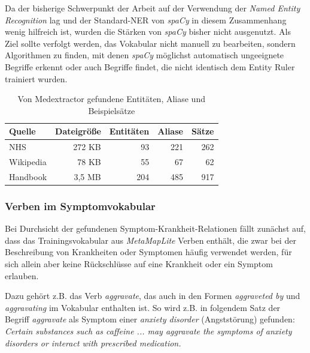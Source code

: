 Da der bisherige Schwerpunkt der Arbeit auf der Verwendung der \emph{Named Entity Recognition} lag und der Standard-NER von \emph{spaCy} in diesem Zusammenhang wenig hilfreich ist, wurden die Stärken von \emph{spaCy} bisher nicht ausgenutzt. Als Ziel sollte verfolgt werden, das Vokabular nicht manuell zu bearbeiten, sondern Algorithmen zu finden, mit denen \emph{spaCy} möglichst automatisch ungeeignete Begriffe erkennt oder auch Begriffe findet, die nicht identisch dem Entity Ruler trainiert wurden.

\begin{table}
\begin{center}
\begin{tabular}{lrrrr}
\hline
\textbf{Quelle}	& \textbf{Dateigröße}	& \textbf{Entitäten} & \textbf{Aliase} & \textbf{Sätze} \\
\hline
NHS &	272 KB & 93 & 221 & 262 \\
Wikipedia & 78 KB & 55 & 67  & 62 \\
Handbook & 3,5 MB & 204 & 485  & 917 \\
\hline
\end{tabular}
\caption{Von Medextractor gefundene Entitäten, Aliase und Beispielsätze}
\label{tab:zaehlung}
\end{center}
\end{table}

\subsubsection{Verben im Symptomvokabular}
\label{subsec: verben} 

Bei Durchsicht der gefundenen Symptom-Krankheit-Relationen fällt zunächst auf, dass das Trainingsvokabular aus \emph{MetaMapLite} Verben enthält, die zwar bei der Beschreibung von Krankheiten oder Symptomen häufig verwendet werden, für sich allein aber keine Rückschlüsse auf eine Krankheit oder ein Symptom erlauben.

Dazu gehört z.B. das Verb \emph{aggravate}, das auch in den Formen \emph{aggraveted by} und \emph{aggravating} im Vokabular enthalten ist. So wird z.B. in folgendem Satz der Begriff \emph{aggravate} als Symptom einer \emph{anxiety disorder} (Angststörung) gefunden:\\

\emph{\glqq Certain substances such as caffeine ... may aggravate the symptoms of anxiety disorders or interact with prescribed medication.\grqq}\\


